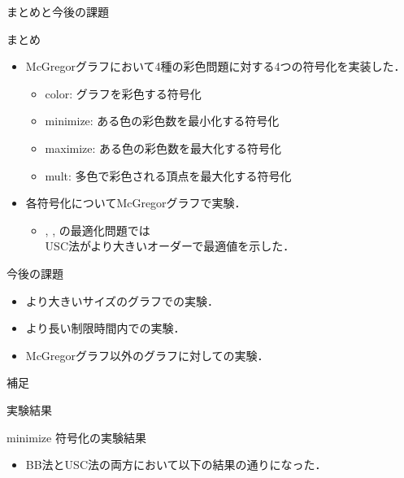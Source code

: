 \documentclass[dvipdfmx,11pt]{beamer}
\begin{document}
\begin{frame}{まとめと今後の課題}
 \begin{block}{まとめ}
  \begin{itemize}
   \item McGregorグラフにおいて4種の彩色問題に対する4つの符号化を実装した．
         \begin{itemize}
          \item \alert{color}: グラフを彩色する符号化
          \item \alert{minimize}: ある色の彩色数を最小化する符号化
          \item \alert{maximize}: ある色の彩色数を最大化する符号化
          \item \alert{mult}: 多色で彩色される頂点を最大化する符号化
         \end{itemize}
   \item 各符号化についてMcGregorグラフで実験．
         \begin{itemize}
          \item {}, , の最適化問題では \\
                USC法がより大きいオーダーで最適値を示した．
         \end{itemize}
  \end{itemize}
 \end{block}

 \begin{alertblock}{今後の課題}
  \begin{itemize}
   \item より大きいサイズのグラフでの実験．
   \item より長い制限時間内での実験．
   \item McGregorグラフ以外のグラフに対しての実験．
  \end{itemize}
 \end{alertblock}
 
\end{frame}


\begin{frame}
 補足
\end{frame}



\begin{frame}{実験結果}
 \begin{block}{minimize}
  符号化の実験結果
  \begin{itemize}
   \item BB法とUSC法の両方において以下の結果の通りになった．
         \centering
         {\tiny }
  \end{itemize}
 \end{block}
\end{frame}
\end{document}

